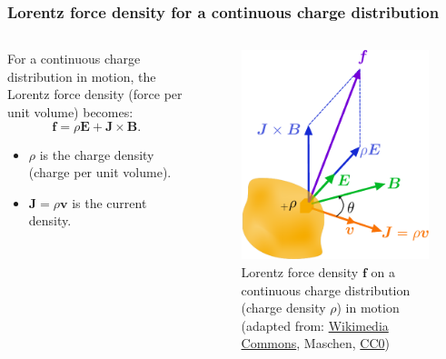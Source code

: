 \begin{frame}
	\frametitle{Lorentz force density for a continuous charge distribution}
    \begin{columns}
		\begin{column}{0.5\textwidth}
         For a continuous charge distribution in motion, the Lorentz force density (force per unit volume) becomes: 
            \begin{equation}
                \bm{f} = \rho\bm{E} + \bm{J}\times\bm{B}.
            \end{equation}
            \begin{itemize}
                \item $\rho$ is the charge density (charge per unit volume).
                \item $\bm{J} = \rho \bm{v}$ is the current density.
            \end{itemize}
		\end{column}
        \hfill
		\begin{column}{0.5\textwidth}
			\begin{figure}
				\centering
				\includegraphics[height=0.6\textheight]{fig/lec02/Lorentz_force_continuum.pdf}
				\caption{Lorentz force density $\bm{f}$ on a continuous charge distribution (charge density $\rho$) in motion (adapted from: \href{https://commons.wikimedia.org/wiki/File:Lorentz_force_continuum.svg}{Wikimedia Commons}, Maschen, \href{https://creativecommons.org/publicdomain/zero/1.0/deed.en}{CC0})}
			\end{figure}
		\end{column}
		\end{columns}
\end{frame}